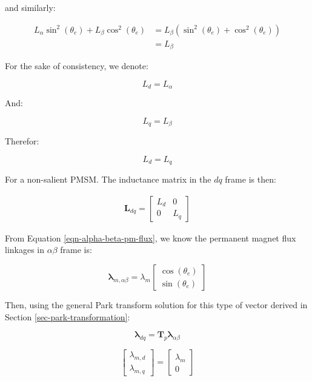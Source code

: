 \documentclass{article}
\begin{document}
and similarly:

\begin{align}
    L_\alpha\sin^2(\theta_e)
    +L_\beta\cos^2(\theta_e)
    &=
    L_\beta
    \left(
        \sin^2(\theta_e)+\cos^2(\theta_e)
    \right)
    \\
    &=L_\beta
\end{align}

For the sake of consistency, we denote:

\begin{equation}
    L_d = L_\alpha
\end{equation}

And:

\begin{equation}
    L_q = L_\beta
\end{equation}

Therefor:

\begin{equation}
    L_d = L_q
\end{equation}

For a non-salient PMSM. The inductance matrix in the $dq$ frame is then:

\begin{align}
    \mathbf{L}_{dq}
    =
    \begin{bmatrix}
        L_d & 0 \\
        0 & L_q
    \end{bmatrix}
\end{align}

From Equation \ref{eqn-alpha-beta-pm-flux}, we know the permanent magnet flux linkages in $\alpha\beta$ frame is:

\begin{equation}
    \boldsymbol{\lambda}_{m,\alpha\beta}
    =
    \lambda_m
    \begin{bmatrix}
        \cos(\theta_e) \\
        \sin(\theta_e)
    \end{bmatrix}
\end{equation}

Then, using the general Park transform solution for this type of vector derived in Section \ref{sec-park-transformation}:

\begin{equation}
    \boldsymbol{\lambda}_{dq} = \mathbf{T}_p\boldsymbol{\lambda}_{\alpha\beta}
\end{equation}

\begin{equation}
    \begin{bmatrix}
        \lambda_{m,d} \\
        \lambda_{m,q}
    \end{bmatrix}
    =
    \begin{bmatrix}
        \lambda_m \\
        0
    \end{bmatrix}
\end{equation}
\end{document}
